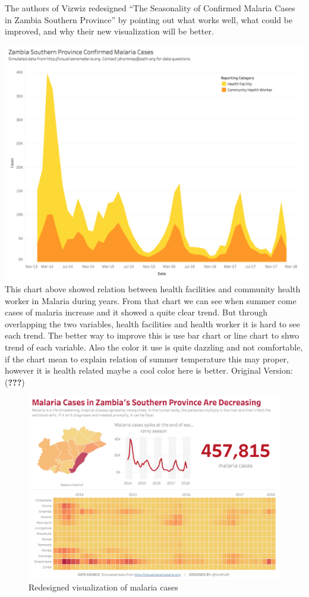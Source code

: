 \documentclass[]{book}
\theoremstyle{definition}
\theoremstyle{definition}
\theoremstyle{definition}
\theoremstyle{remark}
\begin{document}
The authors of Vizwiz redesigned ``The Seasonality of Confirmed Malaria
Cases in Zambia Southern Province'' by pointing out what works well,
what could be improved, and why their new visualization will be better.

\includegraphics{images/malaria_original.png} This chart above showed
relation between health facilities and community health worker in
Malaria during years. From that chart we can see when summer come cases
of malaria increase and it showed a quite clear trend. But through
overlapping the two variables, health facilities and health worker it is
hard to see each trend. The better way to improve this is use bar chart
or line chart to shwo trend of each variable. Also the color it use is
quite dazzling and not comfortable, if the chart mean to explain
relation of summer temperature this may proper, however it is health
related maybe a cool color here is better. Original Version:
({\textbf{???}})

\begin{figure}
\centering
\includegraphics{images/malaria_makeover.png}
\caption{Redesigned visualization of malaria cases}
\end{figure}
\end{document}
